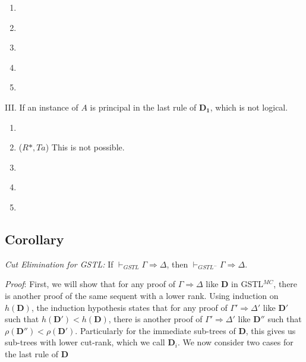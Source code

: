 \begin{enumerate}
	\begin{enumerate}[label={\Alph*.}]
		\item \label{c:ra-la1} 

		\item \label{c:ra-la2} 

		\item \label{c:ro1-lo} 

		\item \label{c:ro2-lo} 


		\item \label{c:ri-li} 

	\end{enumerate}

	III. If an instance of $A$ is principal in the last rule of $\mathbf{D_1}$, which is not logical.
	\begin{enumerate}[label={\roman*.}]
		\item \label{c:*-id} 

		\item ($R*, Ta$) This is not possible.

		\item \label{c:*-ex} 

		\item \label{c:*-lw-p} 
	
		\item \label{c:*-lc-p} 
	\end{enumerate}
\end{enumerate}

\subsection{Corollary} \label{cut-elim} \emph{Cut Elimination for GSTL: }
If $\vdash_{GSTL} \Gamma \Rightarrow \Delta$, then $\vdash_{GSTL^-} \Gamma \Rightarrow \Delta$.

\textit{Proof}: First, we will show that for any proof of $\Gamma \Rightarrow \Delta$ like $\mathbf{D}$ in GSTL$^{MC}$, there is another proof of the same sequent with a lower rank. Using induction on $h(\mathbf{D})$, the induction hypothesis states that for any proof of $\Gamma' \Rightarrow \Delta'$ like $\mathbf{D}'$ such that $h(\mathbf{D}') < h(\mathbf{D})$, there is another proof of $\Gamma' \Rightarrow \Delta'$ like $\mathbf{D}''$ such that $\rho(\mathbf{D}'') < \rho(\mathbf{D}')$. Particularly for the immediate sub-trees of $\mathbf{D}$, this gives us sub-trees with lower cut-rank, which we call $\mathbf{D}_i$. We now consider two cases for the last rule of $\mathbf{D}$

